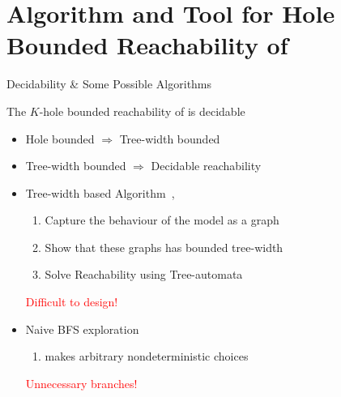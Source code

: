 \documentclass{beamer}
\begin{document}
\section{Algorithm and Tool for Hole Bounded Reachability of \mpda}
\begin{frame}{Decidability \& Some Possible Algorithms}
  \begin{theorem}
The $K$-hole bounded reachability of \mpda{} is decidable
   \end{theorem}
   \begin{itemize}[<+->]
   \item Hole bounded $\Rightarrow$ Tree-width bounded
     \item Tree-width bounded $\Rightarrow$ Decidable reachability~\cite{madhusudan2011tree}
   \end{itemize}
   
   \pause
  \begin{itemize}[<+->]
  \item Tree-width based Algorithm~\cite{AkshayGKS17},
    \begin{enumerate}
    \item Capture the behaviour of the model as a graph
    \item Show that these graphs has bounded tree-width
    \item Solve Reachability using Tree-automata
      
    \end{enumerate}
    \pause
  \hspace{6cm} \begin{rotate}{30}\textcolor{red}{Difficult to design!}
        \end{rotate}
  \item Naive BFS exploration
      
    \begin{enumerate}
    \item makes arbitrary nondeterministic choices  
      \end{enumerate}
      \pause
  \hspace{6cm} \begin{rotate}{30}\textcolor{red}{Unnecessary branches!}
        \end{rotate}  
  \end{itemize}
  
\end{frame}
\end{document}
